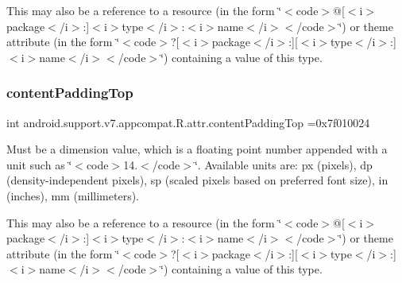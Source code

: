This may also be a reference to a resource (in the form \char`\"{}$<$code$>$@\mbox{[}$<$i$>$package$<$/i$>$\+:\mbox{]}$<$i$>$type$<$/i$>$\+:$<$i$>$name$<$/i$>$$<$/code$>$\char`\"{}) or theme attribute (in the form \char`\"{}$<$code$>$?\mbox{[}$<$i$>$package$<$/i$>$\+:\mbox{]}\mbox{[}$<$i$>$type$<$/i$>$\+:\mbox{]}$<$i$>$name$<$/i$>$$<$/code$>$\char`\"{}) containing a value of this type. \mbox{\label{classandroid_1_1support_1_1v7_1_1appcompat_1_1R_1_1attr_ad487afb8843c5c747a98ac877c051665}} 
\subsubsection{\texorpdfstring{content\+Padding\+Top}{contentPaddingTop}}
{\footnotesize\ttfamily int android.\+support.\+v7.\+appcompat.\+R.\+attr.\+content\+Padding\+Top =0x7f010024\hspace{0.3cm}{\ttfamily [static]}}

Must be a dimension value, which is a floating point number appended with a unit such as \char`\"{}$<$code$>$14.\+5sp$<$/code$>$\char`\"{}. Available units are\+: px (pixels), dp (density-\/independent pixels), sp (scaled pixels based on preferred font size), in (inches), mm (millimeters). 

This may also be a reference to a resource (in the form \char`\"{}$<$code$>$@\mbox{[}$<$i$>$package$<$/i$>$\+:\mbox{]}$<$i$>$type$<$/i$>$\+:$<$i$>$name$<$/i$>$$<$/code$>$\char`\"{}) or theme attribute (in the form \char`\"{}$<$code$>$?\mbox{[}$<$i$>$package$<$/i$>$\+:\mbox{]}\mbox{[}$<$i$>$type$<$/i$>$\+:\mbox{]}$<$i$>$name$<$/i$>$$<$/code$>$\char`\"{}) containing a value of this type. \mbox{\label{classandroid_1_1support_1_1v7_1_1appcompat_1_1R_1_1attr_ab524c966b3d2b0e493bd1b4a72aca159}} 
